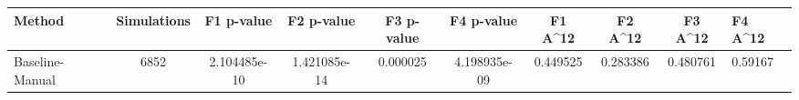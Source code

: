 \begin{tabular}{lcccccccc}
\toprule
         Method &  Simulations &   F1 p-value &   F2 p-value &  F3 p-value &   F4 p-value &  F1 A^12 &  F2 A^12 &  F3 A^12 &  F4 A^12 \\
\midrule
Baseline-Manual &         6852 & 2.104485e-10 & 1.421085e-14 &    0.000025 & 4.198935e-09 & 0.449525 & 0.283386 & 0.480761 &  0.59167 \\
\bottomrule
\end{tabular}
